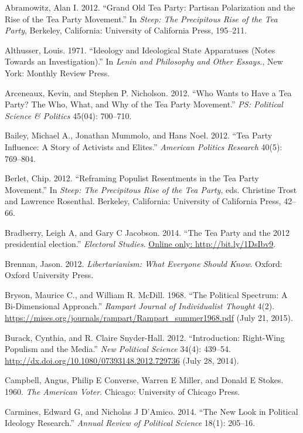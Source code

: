 \documentclass[12pt,]{article}
\begin{document}
\setlength{\parindent}{-0.2in} \setlength{\leftskip}{0.2in}
\setlength{\parskip}{8pt} \vspace*{-0.2in} \noindent

Abramowitz, Alan I. 2012. ``Grand Old Tea Party: Partisan Polarization
and the Rise of the Tea Party Movement.'' In \emph{Steep: The
Precipitous Rise of the Tea Party}, Berkeley, California: University of
California Press, 195--211.

Althusser, Louis. 1971. ``Ideology and Ideological State Apparatuses
(Notes Towards an Investigation).'' In \emph{Lenin and Philosophy and
Other Essays.}, New York: Monthly Review Press.

Arceneaux, Kevin, and Stephen P. Nicholson. 2012. ``Who Wants to Have a
Tea Party? The Who, What, and Why of the Tea Party Movement.'' \emph{PS:
Political Science \& Politics} 45(04): 700--710.

Bailey, Michael A., Jonathan Mummolo, and Hans Noel. 2012. ``Tea Party
Influence: A Story of Activists and Elites.'' \emph{American Politics
Research} 40(5): 769--804.

Berlet, Chip. 2012. ``Reframing Populist Resentments in the Tea Party
Movement.'' In \emph{Steep: The Precipitous Rise of the Tea Party}, eds.
Christine Trost and Lawrence Rosenthal. Berkeley, California: University
of California Press, 42--66.

Bradberry, Leigh A, and Gary C Jacobson. 2014. ``The Tea Party and the
2012 presidential election.'' \emph{Electoral Studies}.
\href{Online only: http://bit.ly/1DsIbv9}{Online only: http://bit.ly/1DsIbv9}.

Brennan, Jason. 2012. \emph{Libertarianism: What Everyone Should Know}.
Oxford: Oxford University Press.

Bryson, Maurice C., and William R. McDill. 1968. ``The Political
Spectrum: A Bi-Dimensional Approach.'' \emph{Rampart Journal of
Individualist Thought} 4(2).
\url{https://mises.org/journals/rampart/Rampart_summer1968.pdf} (July
21, 2015).

Burack, Cynthia, and R. Claire Snyder-Hall. 2012. ``Introduction:
Right-Wing Populism and the Media.'' \emph{New Political Science} 34(4):
439--54. \url{http://dx.doi.org/10.1080/07393148.2012.729736} (July 28,
2014).

Campbell, Angus, Philip E Converse, Warren E Miller, and Donald E
Stokes. 1960. \emph{The American Voter}. Chicago: University of Chicago
Press.

Carmines, Edward G, and Nicholas J D'Amico. 2014. ``The New Look in
Political Ideology Research.'' \emph{Annual Review of Political Science}
18(1): 205--16.
\end{document}
